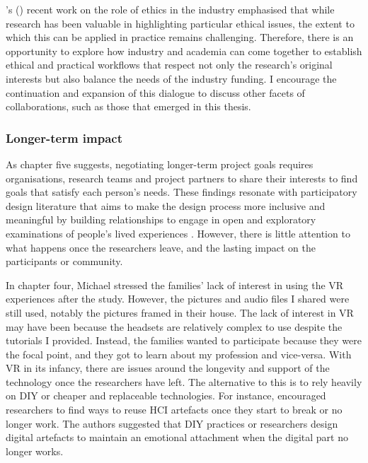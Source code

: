 \citeauthor{longo2020value}'s (\citeyear{longo2020value}) recent work on the role of ethics in the industry emphasised that while research has been valuable in highlighting particular ethical issues, the extent to which this can be applied in practice remains challenging. Therefore, there is an opportunity to explore how industry and academia can come together to establish ethical and practical workflows that respect not only the research's original interests but also balance the needs of the industry funding. I encourage the continuation and expansion of this dialogue to discuss other facets of collaborations, such as those that emerged in this thesis.

\subsubsection{Longer-term impact}
\label{LongTermImpact}
As chapter five suggests, negotiating longer-term project goals requires organisations, research teams and project partners to share their interests to find goals that satisfy each person's needs. These findings resonate with participatory design literature that aims to make the design process more inclusive and meaningful by building relationships to engage in open and exploratory examinations of people's lived experiences \citep{bannon2018introduction,hendriks_challenges_2014}. However, there is little attention to what happens once the researchers leave, and the lasting impact on the participants or community. 

In chapter four, Michael stressed the families' lack of interest in using the VR experiences after the study. However, the pictures and audio files I shared were still used, notably the pictures framed in their house. The lack of interest in VR may have been because the headsets are relatively complex to use despite the tutorials I provided. Instead, the families wanted to participate because they were the focal point, and they got to learn about my profession and vice-versa. With VR in its infancy, there are issues around the longevity and support of the technology once the researchers have left. The alternative to this is to rely heavily on DIY or cheaper and replaceable technologies. For instance, \cite{arakelyan2013facilitation} encouraged researchers to find ways to reuse HCI artefacts once they start to break or no longer work. The authors suggested that DIY practices or researchers design digital artefacts to maintain an emotional attachment when the digital part no longer works.

